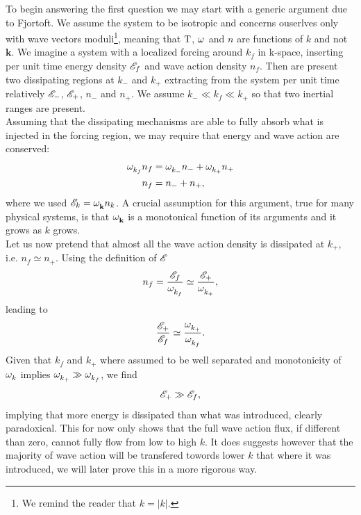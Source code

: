 To begin answering the first question we may start with a generic argument due to Fjortoft. We assume the system to be isotropic and concerns ouserlves only with 
wave vectors moduli\footnote{We remind the reader that $k = |k|$.}, meaning that $\mathrm{T}$, $\omega^{}$ and $n$ are functions of $k$ and not $\mathbf{k}$. 
We imagine a system with a localized forcing 
around $k_f$ in k-space, inserting per unit time energy density $\mathscr{E}_f$ and wave action density $n_f$. Then are present two dissipating regions at $k_-$ and $k_+$
extracting from the system per unit time relatively $\mathscr{E}_-$, $\mathscr{E}_+$, $n_-$ and $n_+$. We assume $k_- \ll k_f \ll k_+$ so that two inertial ranges are present.\\


Assuming that the dissipating mechanisms are able to fully absorb what is injected in the forcing region, we may require that energy and wave action are conserved:
\begin{align}
    \omega^{}_{k_f}n_f &=  \omega^{}_{k_-}n_- + \omega^{}_{k_+}n_+ \\
    n_f &= n_- + n_+,
\end{align}
where we used $\mathscr{E}_k = \omega^{}_{\mathbf{k}} n_k$. A crucial assumption for this argument, true for many physical systems, is that $\omega^{}_{\mathbf{k}}$ is a monotonical function 
of its arguments and it grows as $k$ grows.\\
Let us now pretend that almost all the wave action density is dissipated at $k_+$, i.e. $n_f \simeq n_+$. Using the definition of $\mathscr{E}$ 
\begin{equation}
    n_f = \frac{\mathscr{E}_f}{\omega^{}_{k_f}} \simeq \frac{\mathscr{E}_+}{\omega^{}_{k_+}},
\end{equation}
leading to 
\begin{equation}
    \frac{\mathscr{E}_+}{\mathscr{E}_f} \simeq \frac{\omega^{}_{k_+}}{\omega^{}_{k_f}}.
\end{equation}
Given that $k_f$ and $k_+$ where assumed to be well separated and monotonicity of $\omega^{}_{k}$ implies $\omega^{}_{k_+} \gg \omega^{}_{k_f}$, we find 
\begin{equation}
    \mathscr{E}_+ \gg \mathscr{E}_f,
\end{equation}
implying that more energy is dissipated than what was introduced, clearly paradoxical. This for now only shows that the full wave action flux, if different than zero, cannot 
fully flow from low to high $k$. It does suggests however that the majority of wave action will be transfered towords lower $k$ that where it was introduced, we will 
later prove this in a more rigorous way. \\
